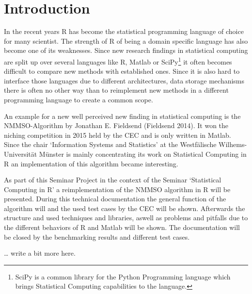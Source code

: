 \documentclass[12pt,a4paper]{article}
\begin{document}
\renewcommand\refname{References} %


\newpage
{} %
\tableofcontents
\newpage
\listoffigures

\newpage
{} %

\section{Introduction}\label{introduction}

In the recent years R has become the statistical programming language of
choice for many scientist. The strength of R of being a domain specific
language has also become one of its weaknesses. Since new research
findings in statistical computing are split up over several languages
like R, Matlab or SciPy\footnote{SciPy is a common library for the
  Python Programming language which brings Statistical Computing
  capabilities to the language.} it often becomes difficult to compare
new methods with established ones. Since it is also hard to interface
those languages due to different architectures, data storage mechanisms
there is often no other way than to reimplement new methods in a
different programming language to create a common scope.

An example for a new well perceived new finding in statistical computing
is the NMMSO-Algorithm by Jonathan E. Fieldsend (Fieldsend 2014). It won
the niching competition in 2015 held by the CEC and is only written in
Matlab. Since the chair `Information Systems and Statistics' at the
Westfälische Wilhems-Universität Münster is mainly concentrating its
work on Statistical Computing in R an implementation of this algorithm
became interesting.

As part of this Seminar Project in the context of the Seminar
`Statistical Computing in R' a reimplementation of the NMMSO algorithm
in R will be presented. During this technical documentation the general
function of the algorithm will and the used test cases by the CEC will
be shown. Afterwards the structure and used techniques and libraries,
aswell as problems and pitfalls due to the different behaviors of R and
Matlab will be shown. The documentation will be closed by the
benchmarking results and different test cases.

\ldots{} write a bit more here.
\end{document}
